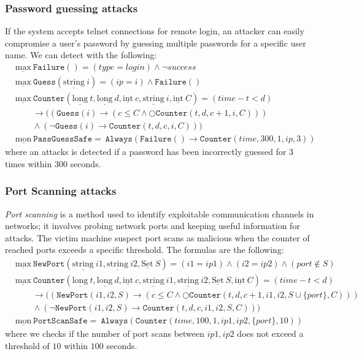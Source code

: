\documentclass[aspectratio=169,t,xcolor=table]{beamer}
\begin{document}
\begin{frame}
    \frametitle{Password guessing attacks}
    If the system accepts telnet connections for remote login, an attacker can easily compromise a user's password by guessing multiple passwords for a specific user name. We can detect with the following:
    \begin{align*}
        & \underline{\text{max}}\ \mathtt{Failure}() = (type=login)\land \neg success\\
        & \underline{\text{max}}\ \mathtt{Guess}(\underline{\text{string}}\ i) = (ip=i)\land \mathtt{Failure}()\\
        & \underline{\text{max}}\ \mathtt{Counter}(\underline{\text{long}}\ t, \underline{\text{long}}\ d, \underline{\text{int}}\ c,\underline{\text{string}}\ i,\underline{\text{int}}\ C) = (time-t<d)\\
        & \quad\quad\rightarrow((\mathtt{Guess}(i)\rightarrow(c\leq C\land \bigcirc\mathtt{Counter}(t,d,c+1,i,C)))  \\
        & \quad\quad\land(\neg \mathtt{Guess}(i)\rightarrow\mathtt{Counter}(t,d,c,i,C))) \\
        & \underline{\text{mon}}\ \mathtt{PassGuessSafe} =\ \mathtt{Always}(\mathtt{Failure}()\rightarrow\mathtt{Counter}(time,300,1,ip,3)) 
    \end{align*}
    where an attacks is detected if a password has been incorrectly guessed for $3$ times within $300$ seconds.
\end{frame}

\begin{frame}
    \frametitle{Port Scanning attacks}
    \textit{Port scanning} is a method used to identify exploitable communication channels in networks; it involves probing network ports and keeping useful information for attacks. The victim machine suspect port scans as malicious when the counter of reached ports exceeds a specific threshold. The formulas are the following:
    \begin{align*}
        & \underline{\text{max}}\ \mathtt{NewPort}(\underline{\text{string}}\ i1,\underline{\text{string}}\ i2,\underline{\text{Set}}\ S) = (i1=ip1)\land(i2=ip2)\land (port \notin S)\\
        & \underline{\text{max}}\ \mathtt{Counter}(\underline{\text{long}}\ t, \underline{\text{long}}\ d, \underline{\text{int}}\ c,\underline{\text{string}}\ i1,\underline{\text{string}}\ i2,\underline{\text{Set}}\ S,\underline{\text{int}}\ C) = (time-t<d)\\
        & \quad\quad\rightarrow((\mathtt{NewPort}(i1,i2,S)\rightarrow(c\leq C\land \bigcirc\mathtt{Counter}(t,d,c+1,i1,i2,S\cup\{port\},C)))  \\
        & \quad\quad\land(\neg \mathtt{NewPort}(i1,i2,S)\rightarrow\mathtt{Counter}(t,d,c,i1,i2,S,C))) \\
        & \underline{\text{mon}}\ \mathtt{PortScanSafe} =\ \mathtt{Always}(\mathtt{Counter}(time,100,1,ip1,ip2,\{port\},10)) 
    \end{align*}
    where we checks if the number of port scans between $ip1,ip2$ does not exceed a threshold of $10$ within $100$ seconds.
\end{frame}
\end{document}
